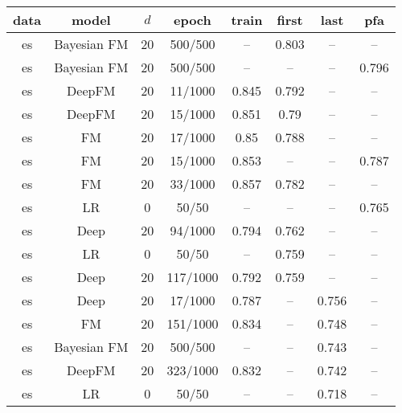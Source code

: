 \begin{tabular}{cccccccc}
\toprule
data &        model &  $d$ &     epoch &  train &  first &   last &    pfa \\
\midrule
  es &  Bayesian FM &   20 &   500/500 &     -- &  0.803 &     -- &     -- \\
  es &  Bayesian FM &   20 &   500/500 &     -- &     -- &     -- &  0.796 \\
  es &       DeepFM &   20 &   11/1000 &  0.845 &  0.792 &     -- &     -- \\
  es &       DeepFM &   20 &   15/1000 &  0.851 &   0.79 &     -- &     -- \\
  es &           FM &   20 &   17/1000 &   0.85 &  0.788 &     -- &     -- \\
  es &           FM &   20 &   15/1000 &  0.853 &     -- &     -- &  0.787 \\
  es &           FM &   20 &   33/1000 &  0.857 &  0.782 &     -- &     -- \\
  es &           LR &    0 &     50/50 &     -- &     -- &     -- &  0.765 \\
  es &         Deep &   20 &   94/1000 &  0.794 &  0.762 &     -- &     -- \\
  es &           LR &    0 &     50/50 &     -- &  0.759 &     -- &     -- \\
  es &         Deep &   20 &  117/1000 &  0.792 &  0.759 &     -- &     -- \\
  es &         Deep &   20 &   17/1000 &  0.787 &     -- &  0.756 &     -- \\
  es &           FM &   20 &  151/1000 &  0.834 &     -- &  0.748 &     -- \\
  es &  Bayesian FM &   20 &   500/500 &     -- &     -- &  0.743 &     -- \\
  es &       DeepFM &   20 &  323/1000 &  0.832 &     -- &  0.742 &     -- \\
  es &           LR &    0 &     50/50 &     -- &     -- &  0.718 &     -- \\
\bottomrule
\end{tabular}
